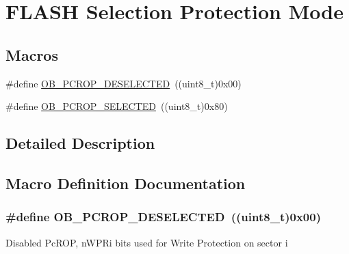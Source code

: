 \hypertarget{group___f_l_a_s_h_ex___selection___protection___mode}{}\section{F\+L\+A\+SH Selection Protection Mode}
\label{group___f_l_a_s_h_ex___selection___protection___mode}
\subsection*{Macros}
\begin{DoxyCompactItemize}
\item 
\#define \hyperlink{group___f_l_a_s_h_ex___selection___protection___mode_gaa11bc40819552615d0618b0df99120b1}{O\+B\+\_\+\+P\+C\+R\+O\+P\+\_\+\+D\+E\+S\+E\+L\+E\+C\+T\+ED}~((uint8\+\_\+t)0x00)
\item 
\#define \hyperlink{group___f_l_a_s_h_ex___selection___protection___mode_ga7de2d3d5fc3baa922d43850a2f140dfc}{O\+B\+\_\+\+P\+C\+R\+O\+P\+\_\+\+S\+E\+L\+E\+C\+T\+ED}~((uint8\+\_\+t)0x80)
\end{DoxyCompactItemize}


\subsection{Detailed Description}


\subsection{Macro Definition Documentation}
\subsubsection[{\texorpdfstring{O\+B\+\_\+\+P\+C\+R\+O\+P\+\_\+\+D\+E\+S\+E\+L\+E\+C\+T\+ED}{OB_PCROP_DESELECTED}}]{\setlength{\rightskip}{0pt plus 5cm}\#define O\+B\+\_\+\+P\+C\+R\+O\+P\+\_\+\+D\+E\+S\+E\+L\+E\+C\+T\+ED~((uint8\+\_\+t)0x00)}\hypertarget{group___f_l_a_s_h_ex___selection___protection___mode_gaa11bc40819552615d0618b0df99120b1}{}\label{group___f_l_a_s_h_ex___selection___protection___mode_gaa11bc40819552615d0618b0df99120b1}
Disabled Pc\+R\+OP, n\+W\+P\+Ri bits used for Write Protection on sector i 

